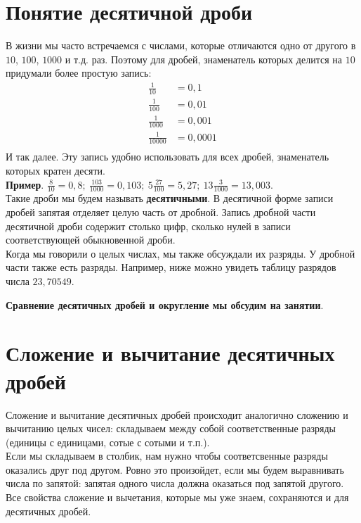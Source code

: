 \documentclass{article}
\begin{document}
\section{Понятие десятичной дроби}
В жизни мы часто встречаемся с числами, которые отличаются одно от другого в $10$, $100$, $1000$ и т.д. раз. Поэтому для дробей, знаменатель которых делится на $10$ придумали более простую запись: 
\begin{align*}
 \frac1{10} &= 0,1\\
 \frac1{100} &= 0,01\\
 \frac1{1000} &= 0,001\\
 \frac1{10000} &= 0,0001\\
\end{align*}
И так далее. Эту запись удобно использовать для всех дробей, знаменатель которых кратен десяти.\\
\textbf{Пример}. $\frac8{10} = 0,8;~ \frac{103}{1000} = 0,103;~ 5\frac{27}{100} = 5,27;~ 13\frac3{1000} = 13,003$.\\
Такие дроби мы будем называть \textbf{десятичными}. В десятичной форме записи дробей запятая отделяет целую часть от дробной. Запись дробной части десятичной дроби содержит столько цифр, сколько нулей в записи соответствующей обыкновенной дроби. \\
Когда мы говорили о целых числах, мы также обсуждали их разряды. У дробной части также есть разряды. Например, ниже можно увидеть таблицу разрядов числа $23,70549$.
\begin{figure}[h]
\end{figure}

\textbf{Сравнение десятичных дробей и округление мы обсудим на занятии}.

\section{Сложение и вычитание десятичных дробей}
Сложение и вычитание десятичных дробей происходит аналогично сложению и вычитанию целых чисел: складываем между собой соответственные разряды (единицы с единицами, сотые с сотыми и т.п.).\\
Если мы складываем в столбик, нам нужно чтобы соответсвенные разряды оказались друг под другом. Ровно это произойдет, если мы будем выравнивать числа по запятой: запятая одного числа должна оказаться под запятой другого.\\
Все свойства сложение и вычетания, которые мы уже знаем, сохраняются и для десятичных дробей.
\end{document}

